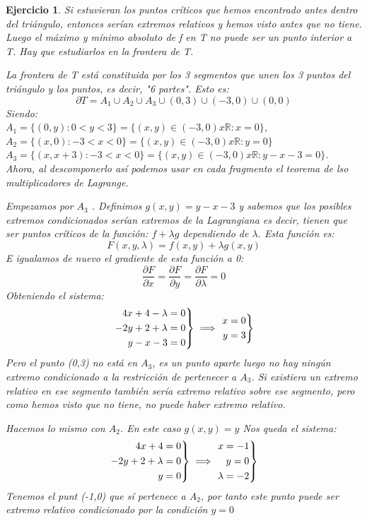 \documentclass[11pt, a4paper, titlepage]{article}
\newcommand{\R}{\mathbb{R}}
\theoremstyle{exercise-style}
\newtheorem*{ejer}{Ejercicio}
\theoremstyle{theorem-style}
\newenvironment{rcases}
  {\left.\begin{aligned}}
  {\end{aligned}\right\rbrace}
\begin{document}
\begin{ejer}
	Si estuvieran los puntos críticos que hemos encontrado antes dentro del triángulo, entonces serían extremos relativos y hemos visto antes que no tiene. Luego el máximo y mínimo absoluto de f en T no puede ser un punto interior a T. Hay que estudiarlos en la frontera de T.
	
	La frontera de T está constituida por los 3 segmentos que unen los 3 puntos del triángulo y los puntos, es decir, "6 partes". Esto es:
	\[
	\partial T = A_1 \cup A_2 \cup A_3 \cup (0,3) \cup (-3,0) \cup (0,0)
	\]
	Siendo:\\ $A_1 = \{ (0,y) : 0 < y < 3\}  = \{(x,y) \in (-3,0)x\R : x = 0\}$,\\
	 $A_2 =\{(x,0) :  -3 < x < 0\} = \{(x,y) \in (-3,0)x \R : y = 0\}$  \\
	 $A_3 =\{(x,x+3) :  -3< x < 0\} = \{(x,y)\in (-3,0)x\R :  y -x-3 = 0\}$.\\
	
	Ahora, al descomponerlo así podemos usar en cada fragmento el teorema de lso multiplicadores de Lagrange.
	
	Empezamos por $A_3$ . Definimos $g(x,y) = y-x-3$ y sabemos que los posibles extremos condicionados serían extremos de la Lagrangiana es decir, tienen que ser puntos críticos de la función: $f+\lambda g$ dependiendo de $\lambda$.
	Esta función es:
	\[
	F(x,y,\lambda) = f(x,y) + \lambda g(x,y)
	\]
	E igualamos de nuevo el gradiente de esta función a 0:
	\[
	\frac{\partial F}{\partial x} =  \frac{\partial F}{\partial y} =\frac{\partial F}{\partial \lambda} = 0
	\]
	Obteniendo el sistema:
	\[
	\begin{rcases}
	4x +4 - \lambda = 0\\
	-2y +2 + \lambda = 0\\
	 y-x-3 = 0
\end{rcases}\implies  \begin{rcases}
	x = 0\\
	y = 3 \\
\end{rcases}
	\]
	Pero el punto (0,3) no está en $A_3$, es un punto aparte luego no hay ningún extremo condicionado a la restricción de pertenecer a $A_3$. Si existiera un extremo relativo en ese segmento también sería extremo relativo sobre ese segmento, pero como hemos visto que no tiene, no puede haber extremo relativo.
	
	Hacemos lo mismo con $A_2$. En este caso $g(x,y) = y$ Nos queda el sistema:
	\[
	\begin{rcases}
	4x +4  = 0\\
	-2y +2 + \lambda = 0\\
	 y = 0
\end{rcases}\implies \begin{rcases}
	x=-1\\
	y = 0\\
	\lambda = -2
\end{rcases}
	\]
	Tenemos el punt (-1,0) que sí pertenece a $A_2$, por tanto este punto puede ser extremo relativo condicionado por la condición $y = 0$
	

\end{ejer}
\end{document}
